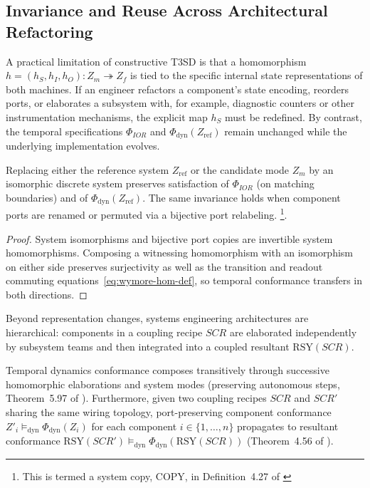 \subsection{Invariance and Reuse Across Architectural Refactoring}
\label{sec:invariance}

A practical limitation of constructive T3SD is that a homomorphism $h=(h_S,h_I,h_O):Z_m\twoheadrightarrow Z_f$ is tied to the specific internal state representations of both machines. If an engineer refactors a component's state encoding, reorders ports, or elaborates a subsystem with, for example, diagnostic counters or other instrumentation mechanisms, the explicit map $h_S$ must be redefined. By contrast, the temporal specifications $\Phi_{IOR}$ and $\Phi_{\mathrm{dyn}}(Z_{\mathrm{ref}})$ remain unchanged while the underlying implementation evolves.

\begin{theorem}
\label{thm:encoding-invariance}
Replacing either the reference system $Z_{\mathrm{ref}}$ or the candidate mode $Z_m$ by an isomorphic discrete system preserves satisfaction of $\Phi_{IOR}$ (on matching boundaries) and of $\Phi_{\mathrm{dyn}}(Z_{\mathrm{ref}})$. The same invariance holds when component ports are renamed or permuted via a bijective port relabeling. \footnote{This is termed a system copy, $\mathrm{COPY}$, in Definition~4.27 of \citet{Wymore1993}}.
\end{theorem}

\begin{proof}
System isomorphisms and bijective port copies are invertible system homomorphisms. Composing a witnessing homomorphism with an isomorphism on either side preserves surjectivity as well as the transition and readout commuting equations~\eqref{eq:wymore-hom-def}, so temporal conformance transfers in both directions.
\end{proof}

Beyond representation changes, systems engineering architectures are hierarchical: components in a coupling recipe $SCR$ are elaborated independently by subsystem teams and then integrated into a coupled resultant $\mathrm{RSY}(SCR)$.

\begin{theorem}
\label{thm:elaboration-coupling}
Temporal dynamics conformance composes transitively through successive homomorphic elaborations and system modes (preserving autonomous steps, Theorem~5.97 of \citet{Wymore1993}). Furthermore, given two coupling recipes $SCR$ and $SCR'$ sharing the same wiring topology, port-preserving component conformance $Z'_i\models_{\mathrm{dyn}}\Phi_{\mathrm{dyn}}(Z_i)$ for each component $i\in\{1,\dots,n\}$ propagates to resultant conformance $\mathrm{RSY}(SCR')\models_{\mathrm{dyn}}\Phi_{\mathrm{dyn}}(\mathrm{RSY}(SCR))$ (Theorem~4.56 of \citet{Wymore1993}).
\end{theorem}

